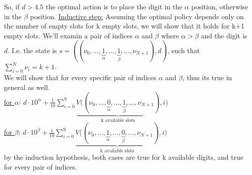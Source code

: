 \documentclass{assignmeownt}
\begin{document}
\begin{enumerate}
\begin{equation}
\end{equation}
\newline
So, if $d > 4.5$ the optimal action is to place the digit in the $\alpha$ position, otherwise in the $\beta$ position.
\newline
\underline{Inductive step:} Assuming the optimal policy depends only on the number of empty slots for k empty slots, we will show that it holds for k+1 empty slots. We'll examin a pair of indices $\alpha$ and $\beta$ where $\alpha > \beta$ and the digit is $d$. I.e. the state is $s=((\nu_0, \dots, \underbrace{1}_{{\alpha}}, \dots, \underbrace{1}_{{\beta}}, \dots, \nu_{N+1}), d)$, such that $\sum_{i=0}^{N} \nu_i = k+1$.
\\
We will show that for every specific pair of indices $\alpha$ and $\beta$, thus its true in general as well.
\\
\underline{for $\alpha$}: $
    d \cdot 10^{\alpha} + \frac{1}{10} \sum_{i=0}^{9} 
    \underbrace{V((\nu_0, \dots, \underbrace{0}_{\alpha}, \dots, \underbrace{1}_{\beta}, \dots, \nu_{N+1})}_{\text{k available slots}}, i) $
\\
\underline{for $\beta$}: $
    d \cdot 10^{\beta} + \frac{1}{10} \sum_{i=0}^{9} 
    \underbrace{V((\nu_0, \dots, \underbrace{1}_{\alpha}, \dots, \underbrace{0}_{\beta}, \dots, \nu_{N+1})}_{\text{k available slots}}, i) $
\\
by the induction hypothesis, both cases are true for k available digits, and true for every pair of indices. 


\end{enumerate}
\end{document}
